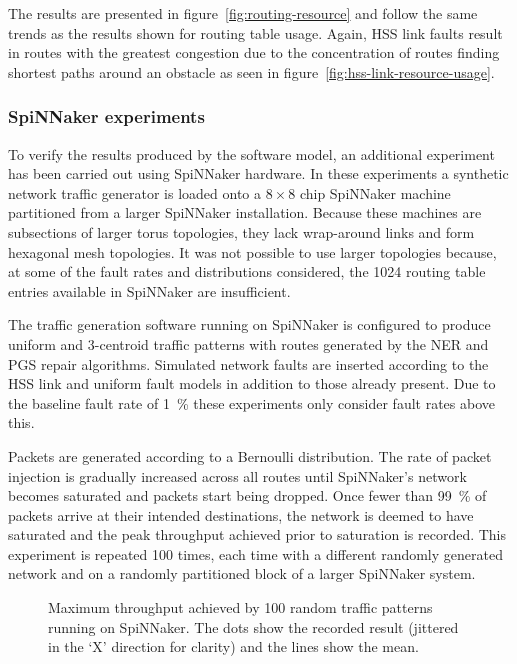 				The results are presented in figure~\ref{fig:routing-resource} and
				follow the same trends as the results shown for routing table usage.
				Again, HSS link faults result in routes with the greatest congestion
				due to the concentration of routes finding shortest paths around an
				obstacle as seen in figure~\ref{fig:hss-link-resource-usage}.
			
			\subsubsection{SpiNNaker experiments}
			
				To verify the results produced by the software model, an additional
				experiment has been carried out using SpiNNaker hardware. In these
				experiments a synthetic network traffic generator is loaded onto a
				$8\times8$ chip SpiNNaker machine partitioned from a larger SpiNNaker
				installation.  Because these machines are subsections of larger torus
				topologies, they lack wrap-around links and form hexagonal mesh
				topologies. It was not possible to use larger topologies because, at
				some of the fault rates and distributions considered, the \num{1024}
				routing table entries available in SpiNNaker are insufficient.
				
				The traffic generation software running on SpiNNaker is configured to
				produce uniform and 3-centroid traffic patterns with routes generated
				by the NER and PGS repair algorithms. Simulated network faults are
				inserted according to the HSS link and uniform fault models in addition
				to those already present. Due to the baseline fault rate of
				\SI{1}{\percent} these experiments only consider fault rates above
				this.
				
				Packets are generated according to a Bernoulli distribution. The rate
				of packet injection is gradually increased across all routes until
				SpiNNaker's network becomes saturated and packets start being dropped.
				Once fewer than \SI{99}{\percent} of packets arrive at their intended
				destinations, the network is deemed to have saturated and the peak
				throughput achieved prior to saturation is recorded. This experiment is
				repeated 100 times, each time with a different randomly generated
				network and on a randomly partitioned block of a larger SpiNNaker
				system.
				
				\begin{figure}
					\center
					
					\caption[Maximum throughput achieved on SpiNNaker.]%
					{Maximum throughput achieved by \num{100} random traffic
					patterns running on SpiNNaker. The dots show the recorded result
					(jittered in the `X' direction for clarity) and the lines show the
					mean.}
					\label{fig:routing-hardware}
				\end{figure}
				
